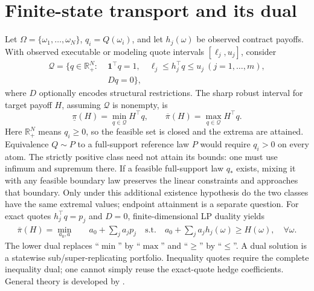 \documentclass[11pt]{article}
\newcommand{\one}{\mathbf{1}}
\newcommand{\QQ}{\mathcal{Q}}
\begin{document}
\section{Finite-state transport and its dual}
Let $\Omega=\{\omega_1,\ldots,\omega_N\}$, $q_i=Q(\omega_i)$, and let
$h_j(\omega)$ be observed contract payoffs. With observed executable or
modeling quote intervals $[\ell_j,u_j]$, consider
\begin{align}
\QQ=\bigl\{q\in\mathbb R_+^N:\; &\one^\top q=1,\quad
\ell_j\le h_j^\top q\le u_j\ (j=1,\ldots,m),\\
& Dq=0\bigr\},
\end{align}
where $D$ optionally encodes structural restrictions. The sharp robust
interval for target payoff $H$, assuming $\QQ$ is nonempty, is
\begin{equation}
\underline\pi(H)=\min_{q\in\QQ}H^\top q,\qquad
\overline\pi(H)=\max_{q\in\QQ}H^\top q.
\label{eq:bounds}
\end{equation}
Here $\mathbb R_+^N$ means $q_i\ge0$, so the feasible set is closed and
the extrema are attained. Equivalence $Q\sim P$ to a full-support reference
law $P$ would require $q_i>0$ on every atom. The strictly positive class
need not attain its bounds: one must use infimum and supremum there.
If a feasible full-support law $q_*$ exists, mixing it with any feasible
boundary law preserves the linear constraints and approaches that boundary.
Only under this additional existence hypothesis do the two classes have
the same extremal values; endpoint attainment is a separate question.
For exact quotes $h_j^\top q=p_j$ and $D=0$, finite-dimensional LP duality
yields
\begin{align}
\overline\pi(H)=\min_{a_0,a}&\quad a_0+\sum_j a_jp_j
\quad\text{s.t.}\quad a_0+\sum_j a_jh_j(\omega)\ge H(\omega),\quad\forall\omega.
\end{align}
The lower dual replaces ``$\min$'' by ``$\max$'' and ``$\ge$'' by ``$\le$''.
A dual solution is a statewise sub/super-replicating portfolio. Inequality
quotes require the complete inequality dual; one cannot simply reuse the
exact-quote hedge coefficients. General theory is developed by
\citet{beiglbock2013model}.
\end{document}
